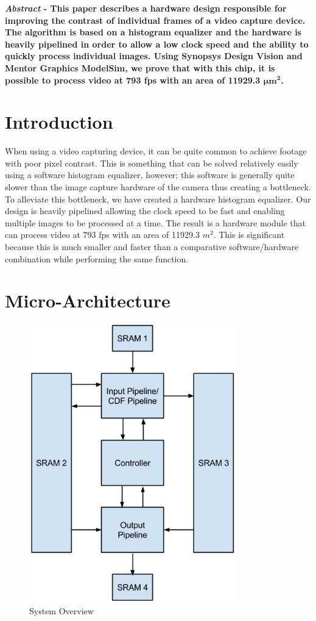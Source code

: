 \documentclass[10pt]{IEEEtran}
\begin{document}

\textbf{\emph{Abstract} - This paper describes a hardware design responsible for improving the contrast of individual frames of a video capture device. The algorithm is based on a histogram equalizer and the hardware is heavily pipelined in order to allow a low clock speed and the ability to quickly process individual images. Using Synopsys Design Vision and Mentor Graphics ModelSim, we prove that with this chip, it is possible to process video at 793 fps with an area of 11929.3 $\mathbf{\boldsymbol\mu m^{2}}$.}
 

\section{Introduction}

When using a video capturing device, it can be quite common to achieve footage with poor pixel contrast. This is something that can be solved relatively easily using a software histogram equalizer, however; this software is generally quite slower than the image capture hardware of the camera thus creating a bottleneck. To alleviate this bottleneck, we have created a hardware histogram equalizer. Our design is heavily pipelined allowing the clock speed to be fast and enabling multiple images to be processed at a time. The result is a hardware module that can process video at 793 fps with an area of 11929.3 $m^{2}$. This is significant because this is much smaller and faster than a comparative software/hardware combination while performing the same function.
 

\section{Micro-Architecture}

\begin{figure}[htb!]
	\includegraphics[width=90mm]{System_Overview.png}
	\caption{System Overview}
\end{figure}
\end{document}
